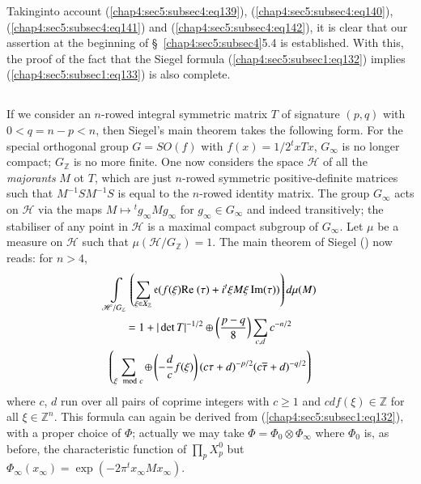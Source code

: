 Taking\pageoriginale into account (\ref{chap4:sec5:subsec4:eq139}),
(\ref{chap4:sec5:subsec4:eq140}), (\ref{chap4:sec5:subsec4:eq141}) and
(\ref{chap4:sec5:subsec4:eq142}), it is clear that our assertion at the
beginning of \S\ \ref{chap4:sec5:subsec4}{5.4} is established. With this, the proof of the
fact that the Siegel formula (\ref{chap4:sec5:subsec1:eq132}) implies
(\ref{chap4:sec5:subsec1:eq133}) is also complete.

\subsection{}\label{chap4:sec5:subsec5} %

If we consider an $n$-rowed integral symmetric matrix $T$ of signature
$(p,q)$ with $0<q=n-p<n$, then Siegel's main theorem takes the
following form. For the special orthogonal group $G=SO(f)$ with
$f(x)=1/2{}^{t}xTx$, $G_{\infty}$ is no longer compact;
$G_{\mathbb{Z}}$ is no more finite. One now considers the space
$\mathscr{H}$ of all the {\em majorants} $M$ ot $T$, which are just
$n$-rowed symmetric positive-definite matrices such that
$M^{-1}SM^{-1}S$ is equal to the $n$-rowed identity matrix. The group
$G_{\infty}$ acts on $\mathscr{H}$ via the maps $M\mapsto
{}^{t}g_{\infty}Mg_{\infty}$ for $g_{\infty}\in G_{\infty}$ and indeed
transitively; the stabiliser of any point in $\mathscr{H}$ is a
maximal compact subgroup of $G_{\infty}$. Let $\mu$ be a measure on
$\mathscr{H}$ such that $\mu(\mathscr{H}/G_{\mathbb{Z}})=1$. The main
theorem of Siegel (\cite{Sie 3}) now reads: for $n>4$,
\begin{multline*}
  \int\limits_{\mathscr{H}/G_{\mathbb{Z}}}\left(\sum_{\xi\in
    X_{\mathbb{Z}}}\mathfrak{e}(f(\xi)\text{Re } (\tau)+i{}^{t}\xi M\xi\operatorname{Im}
  (\tau))\right)d\mu(M)\\ 
  =1+|\det
  T|^{-1/2}\oplus \left(\frac{p-q}{8}\right)\sum_{c,d}c^{-n/2}\\
  \left(\sum_{\xi\mod c}\oplus \left(-\dfrac{d}{c}f(\xi)\right) 
  (c\tau+d)^{-p/2}(c\overline{\tau}+d)^{-q/2}\right) 
\end{multline*}
where $c$, $d$ run over all pairs of coprime integers with $c\geq 1$
and $cdf(\xi)\in\mathbb{Z}$ for all $\xi\in\mathbb{Z}^{n}$. This
formula can again be derived from (\ref{chap4:sec5:subsec1:eq132}), with a proper choice of
$\Phi$; actually we may take $\Phi=\Phi_{0}\otimes\Phi_{\infty}$ where
$\Phi_{0}$ is, as before, the characteristic function of
$\prod\limits_{p}X^{0}_{p}$ but
$\Phi_{\infty}(x_{\infty})=\exp(-2\pi{}^{t}x_{\infty}Mx_{\infty})$.

